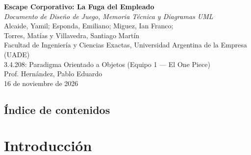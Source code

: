 \documentclass[12pt, a4paper]{article}
\begin{document}
\begin{titlepage}
    \thispagestyle{empty}
    \centering
    \vspace*{2.2cm}

    {\textbf{Escape Corporativo: La Fuga del Empleado}}\\[0.3cm]
    {\textit{Documento de Diseño de Juego, Memoria Técnica y Diagramas UML}}\\[2.2cm]

    Alcaide, Yamil; Esponda, Emiliano; Miguez, Ian Franco;\\
    Torres, Matías y Villavedra, Santiago Martín\\[0.8cm]

    Facultad de Ingeniería y Ciencias Exactas, Universidad Argentina de la Empresa (UADE)\\
    3.4.208: Paradigma Orientado a Objetos (Equipo 1 — El One Piece)\\
    Prof. Hernández, Pablo Eduardo\\
    16 de noviembre de 2026

    \vfill
\end{titlepage}

\newpage
\setcounter{page}{2}
\begin{singlespace}
\section*{Índice de contenidos}
\vspace{-0.4cm}
\renewcommand{\contentsname}{}
\tableofcontents
\end{singlespace}
\newpage

\setlength{\parindent}{1.27cm}
\setlength{\parskip}{0pt}

\section{Introducción}
\end{document}
